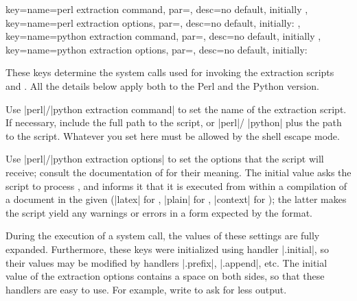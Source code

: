 \documentclass[a4paper,11pt]{article}
\begin{document}
\begin{doc}{
    key={name=perl extraction command, par=,
      desc={no default, initially }},
    key={name=perl extraction options, par=,
      desc={no default, initially: }},
    key={name=python extraction command, par=, desc={no
        default, initially }},
    key={name=python extraction options, par=, desc={no default,
        initially: }} }
  
  These keys determine the system calls used for invoking the extraction
  scripts  and .
  All the details below apply both to the Perl and the Python version.

  Use |perl|\slash|python extraction command| to set the name of the extraction
  script.  If necessary, include the full path to the script, or |perl|\slash
  |python| plus the path to the script.  Whatever you set here must be allowed
  by the shell escape mode.

  Use |perl|\slash|python extraction options| to set the options that the
  script will receive; consult the documentation of
   for their meaning.  The initial value asks the
  script to process \dmmz, and informs it that it is
  executed from within a  compilation of a document in the given
   (|latex| for , |plain| for ,
  |context| for ); the latter makes the script yield any
  warnings or errors in a form expected by the format.

  During the execution of a system call, the values of these settings are fully
  expanded.  Furthermore, these keys were initialized using 
  handler |.initial|, so their values may be modified by handlers |.prefix|,
  |.append|, etc.  The initial value of the extraction options contains a space
  on both sides, so that these handlers are easy to use.  For example, write
   to ask
  for less output.
\end{doc}
\end{document}

